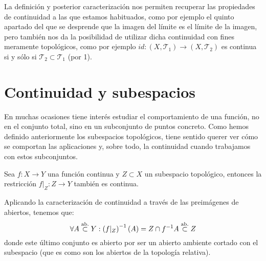 \begin{obs}
La definición y posterior caracterización nos permiten recuperar las propiedades de continuidad a las que estamos habituados, como por ejemplo el quinto apartado del que se desprende que la imagen del límite es el límite de la imagen, pero también nos da la posibilidad de utilizar dicha continuidad con fines meramente topológicos, como por ejemplo $id: \left( X, \mathcal{T}_1 \right) \rightarrow \left( X, \mathcal{T}_2 \right)$ es continua si y sólo si $\mathcal{T}_2 \subset \mathcal{T}_1$ (por 1).
\end{obs}

\section{Continuidad y subespacios}%
\label{sec:continuidad_y_subespacios}
En muchas ocasiones tiene interés estudiar el comportamiento de una función, no en el conjunto total, sino en un subconjunto de puntos concreto. Como hemos definido anteriormente los subespacios topológicos, tiene sentido querer ver cómo se comportan las aplicaciones y, sobre todo, la continuidad cuando trabajamos con estos subconjuntos.

\begin{prop}
Sea $f: X \rightarrow Y$ una función continua y $Z \subset X$ un subespacio topológico, entonces la restricción $f|_Z : Z \rightarrow Y$ también es continua.
\end{prop}
\begin{demo}
Aplicando la caracterización de continuidad a través de las preimágenes de abiertos, tenemos que:
\[
\forall A \stackrel{\text{ab.}}{\subset} Y : \left( f|_Z \right)^{-1} \left( A \right) = Z \cap f^{-1} A \stackrel{\text{ab.}}{\subset} Z
\]
donde este último conjunto es abierto por ser un abierto ambiente cortado con el subespacio (que es como son los abiertos de la topología relativa).
\end{demo}

